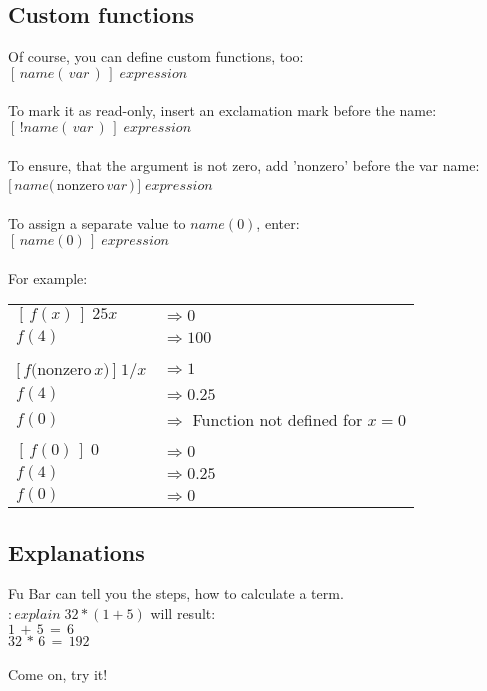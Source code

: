 \documentclass[12pt,a4paper]{article}
\begin{document}
	\subsection{Custom functions}
	
	Of course, you can define custom functions, too:\\
	$[\,name(\,var\,)\,]\;expression$\\\\
	To mark it as read-only, insert an exclamation mark before the name:\\
	$[\,!name(\,var\,)\,]\;expression$\\\\
	To ensure, that the argument is not zero, add 'nonzero' before the var name:\\
	$[\,name(\,$nonzero$\,var\,)\,]\;expression$\\\\
	To assign a separate value to $name(0)$, enter:\\
	$[\,name(0)\,]\;expression$\\\\
	For example:\\
	\begin{tabular}{ll}
	$[\,f(x)\,]\;25x$ & $\Rightarrow 0$\\
    $f(4)$& $\Rightarrow 100$\\
    \\
    $[\,f($nonzero$\,x)\,]\;1/x$ & $\Rightarrow 1$\\
    $f(4)$ & $\Rightarrow 0.25$\\
    $f(0)$ & $\Rightarrow$ Function not defined for $x=0$\\
    \\
    $[\,f(0)\,]\;0$ & $\Rightarrow 0$\\
    $f(4)$ & $\Rightarrow 0.25$\\
    $f(0)$ & $\Rightarrow 0$
	\end{tabular}
	
	\subsection{Explanations}
	
	Fu Bar can tell you the steps, how to calculate a term.\\
	$:explain\;32*(1+5)$ will result:\\
	$1\,+\,5\,=\,6$\\
	$32\,*\,6\,=\,192$\\\\
	Come on, try it!
\end{document}

